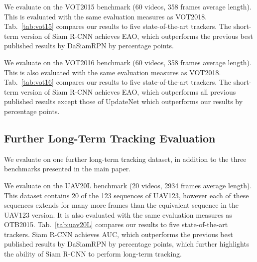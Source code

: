 \documentclass[10pt,twocolumn,letterpaper]{article}
\newcommand{\PAR}[1]{\vskip1pt \noindent {\bf #1~}}
\begin{document}
\PAR{VOT2015.} We evaluate on the VOT2015 benchmark \cite{Kristan15ICCVW} (60 videos, 358 frames average length). This is evaluated with the same evaluation measures as VOT2018. Tab.~\ref{tab:vot15} compares our results to five state-of-the-art trackers.
The short-term version of Siam R-CNN achieves  EAO, which outperforms the previous best published results by DaSiamRPN \cite{Zhu18ECCV} by  percentage points. 

\PAR{VOT2016.} We evaluate on the VOT2016 benchmark \cite{Kristan16ECCVW} (60 videos, 358 frames average length). This is also evaluated with the same evaluation measures as VOT2018. Tab.~\ref{tab:vot16} compares our results to five state-of-the-art trackers.
The short-term version of Siam R-CNN achieves  EAO, which outperforms all previous published results except those of UpdateNet \cite{Zhang19ICCV} which outperforms our results by  percentage points. 


\subsection{Further Long-Term Tracking Evaluation}
We evaluate on one further long-term tracking dataset, in addition to the three benchmarks presented in the main paper. 

\PAR{UAV20L.} We evaluate on the UAV20L benchmark \cite{Mueller16ECCV} (20 videos, 2934 frames average length). This dataset contains 20 of the 123 sequences of UAV123, however each of these sequences extends for many more frames than the equivalent sequence in the UAV123 version. It is also evaluated with the same evaluation measures as OTB2015. Tab.~\ref{tab:uav20L} compares our results to five state-of-the-art trackers.
Siam R-CNN achieves  AUC, which outperforms the previous best published results by DaSiamRPN \cite{Zhu18ECCV} by  percentage points, which further highlights the ability of Siam R-CNN to perform long-term tracking. 
\end{document}
